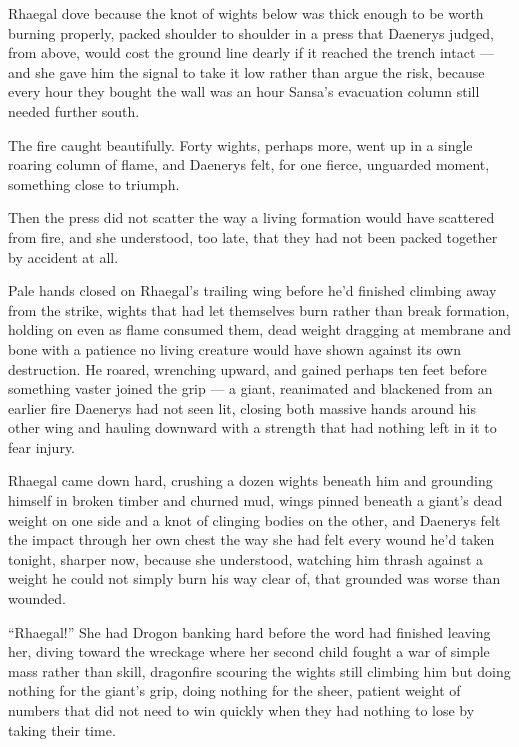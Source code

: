 Rhaegal dove because the knot of wights below was thick enough to be worth burning properly, packed shoulder to shoulder in a press that Daenerys judged, from above, would cost the ground line dearly if it reached the trench intact — and she gave him the signal to take it low rather than argue the risk, because every hour they bought the wall was an hour Sansa’s evacuation column still needed further south.

The fire caught beautifully. Forty wights, perhaps more, went up in a single roaring column of flame, and Daenerys felt, for one fierce, unguarded moment, something close to triumph.

Then the press did not scatter the way a living formation would have scattered from fire, and she understood, too late, that they had not been packed together by accident at all.

\sceneBreak

Pale hands closed on Rhaegal’s trailing wing before he’d finished climbing away from the strike, wights that had let themselves burn rather than break formation, holding on even as flame consumed them, dead weight dragging at membrane and bone with a patience no living creature would have shown against its own destruction. He roared, wrenching upward, and gained perhaps ten feet before something vaster joined the grip — a giant, reanimated and blackened from an earlier fire Daenerys had not seen lit, closing both massive hands around his other wing and hauling downward with a strength that had nothing left in it to fear injury.

Rhaegal came down hard, crushing a dozen wights beneath him and grounding himself in broken timber and churned mud, wings pinned beneath a giant’s dead weight on one side and a knot of clinging bodies on the other, and Daenerys felt the impact through her own chest the way she had felt every wound he’d taken tonight, sharper now, because she understood, watching him thrash against a weight he could not simply burn his way clear of, that grounded was worse than wounded.

“Rhaegal!” She had Drogon banking hard before the word had finished leaving her, diving toward the wreckage where her second child fought a war of simple mass rather than skill, dragonfire scouring the wights still climbing him but doing nothing for the giant’s grip, doing nothing for the sheer, patient weight of numbers that did not need to win quickly when they had nothing to lose by taking their time.

\sceneBreak


